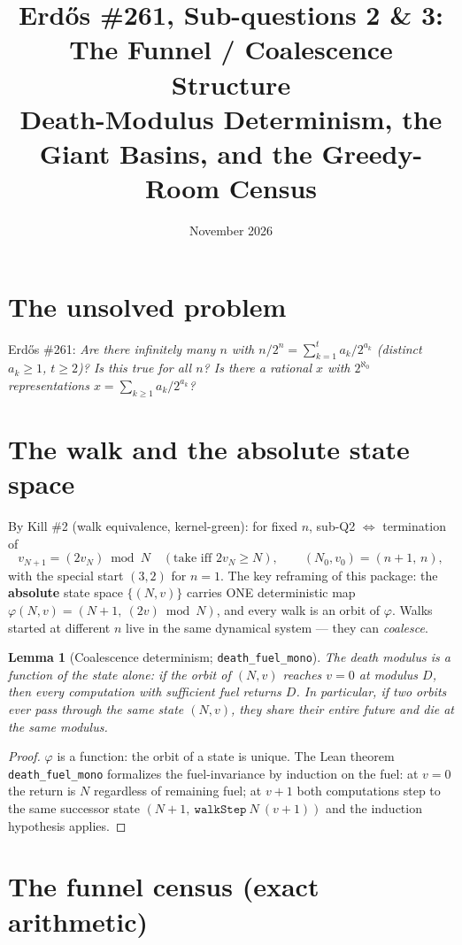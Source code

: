 \documentclass[11pt]{article}
\title{Erd\H{o}s \#261, Sub-questions 2 \& 3: The Funnel / Coalescence Structure\\
\large Death-Modulus Determinism, the Giant Basins, and the Greedy-Room Census}
\date{November 2026}
\newtheorem{lemma}[theorem]{Lemma}
\begin{document}
\maketitle

\section{The unsolved problem}

Erd\H{o}s \#261: \emph{Are there infinitely many $n$ with
$n/2^n = \sum_{k=1}^t a_k/2^{a_k}$ (distinct $a_k\ge 1$, $t\ge 2$)? Is this
true for all $n$? Is there a rational $x$ with $2^{\aleph_0}$ representations
$x=\sum_{k\ge 1} a_k/2^{a_k}$?}

\section{The walk and the absolute state space}

By Kill \#2 (walk equivalence, kernel-green): for fixed $n$, sub-Q2
$\iff$ termination of
\[
v_{N+1} = (2v_N)\bmod N \quad (\text{take iff } 2v_N\ge N),
\qquad (N_0,v_0)=(n+1,\,n),
\]
with the special start $(3,2)$ for $n=1$. The key reframing of this
package: the \textbf{absolute} state space $\{(N,v)\}$ carries ONE
deterministic map $\varphi(N,v) = (N+1,\ (2v)\bmod N)$, and every walk is
an orbit of $\varphi$. Walks started at different $n$ live in the same
dynamical system --- they can \emph{coalesce}.

\begin{lemma}[Coalescence determinism; \texttt{death\_fuel\_mono}]
The death modulus is a function of the state alone: if the orbit of
$(N,v)$ reaches $v=0$ at modulus $D$, then every computation with
sufficient fuel returns $D$. In particular, if two orbits ever pass
through the same state $(N,v)$, they share their entire future and die at
the same modulus.
\end{lemma}

\begin{proof}
$\varphi$ is a function: the orbit of a state is unique. The Lean theorem
\texttt{death\_fuel\_mono} formalizes the fuel-invariance by induction on
the fuel: at $v=0$ the return is $N$ regardless of remaining fuel; at
$v+1$ both computations step to the same successor state
$(N+1,\ \texttt{walkStep}\ N\ (v+1))$ and the induction hypothesis
applies.
\end{proof}

\section{The funnel census (exact arithmetic)}
\end{document}
